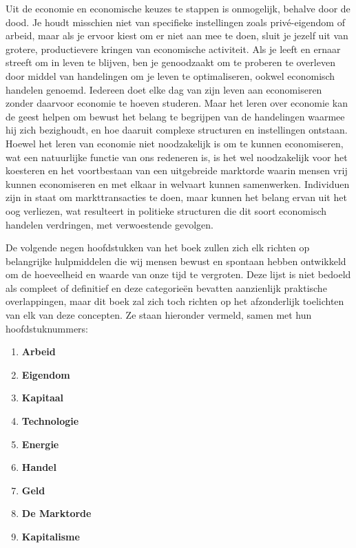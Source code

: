 Uit de economie en economische keuzes te stappen is onmogelijk, behalve
door de dood. Je houdt misschien niet van specifieke instellingen zoals
privé-eigendom of arbeid, maar als je ervoor kiest om er niet aan mee te
doen, sluit je jezelf uit van grotere, productievere kringen van
economische activiteit. Als je leeft en ernaar streeft om in leven te
blijven, ben je genoodzaakt om te proberen te overleven door middel van
handelingen om je leven te optimaliseren, ookwel economisch handelen
genoemd. Iedereen doet elke dag van zijn leven aan economiseren zonder
daarvoor economie te hoeven studeren. Maar het leren over economie kan
de geest helpen om bewust het belang te begrijpen van de handelingen
waarmee hij zich bezighoudt, en hoe daaruit complexe structuren en
instellingen ontstaan. Hoewel het leren van economie niet noodzakelijk
is om te kunnen economiseren, wat een natuurlijke functie van ons
redeneren is, is het wel noodzakelijk voor het koesteren en het
voortbestaan van een uitgebreide marktorde waarin mensen vrij kunnen
economiseren en met elkaar in welvaart kunnen samenwerken. Individuen
zijn in staat om markttransacties te doen, maar kunnen het belang ervan
uit het oog verliezen, wat resulteert in politieke structuren die dit
soort economisch handelen verdringen, met verwoestende gevolgen.

De volgende negen hoofdstukken van het boek zullen zich elk richten op
belangrijke hulpmiddelen die wij mensen bewust en spontaan hebben
ontwikkeld om de hoeveelheid en waarde van onze tijd te vergroten. Deze
lijst is niet bedoeld als compleet of definitief en deze categorieën
bevatten aanzienlijk praktische overlappingen, maar dit boek zal zich
toch richten op het afzonderlijk toelichten van elk van deze concepten.
Ze staan hieronder vermeld, samen met hun hoofdstuknummers:

\begin{multicols}{2}
\begin{enumerate}
\def\labelenumi{\arabic{enumi}.}
\setcounter{enumi}{3}
\item
  \textbf{Arbeid}
\item
  \textbf{Eigendom}
\item
  \textbf{Kapitaal}
\item
  \textbf{Technologie}
\item
  \textbf{Energie}
\item
  \textbf{Handel}
\item
  \textbf{Geld}
\item
  \textbf{De Marktorde}
\item
  \textbf{Kapitalisme}
\end{enumerate}

\end{multicols}

